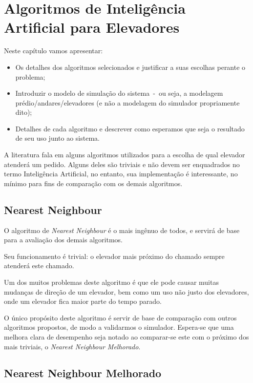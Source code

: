 \chapter{\label{chap:ai}Algoritmos de Inteligência Artificial para Elevadores}

Neste capítulo vamos apresentar:

\begin{itemize}
\item Os detalhes dos algoritmos selecionados e justificar a suas escolhas perante o problema;
\item Introduzir o modelo de simulação do sistema~-~ou seja, a modelagem
prédio/andares/elevadores (e não a modelagem do simulador propriamente dito);
\item Detalhes de cada algoritmo e descrever como esperamos que seja o resultado de seu uso junto ao sistema.
\end{itemize}

A literatura fala em alguns algoritmos utilizados para a escolha de qual
elevador atenderá um pedido. Alguns deles são triviais e não devem ser
enquadrados no termo Inteligência Artificial, no entanto, sua implementação é
interessante, no mínimo para fins de comparação com os demais algoritmos.

\section{\label{sec:ai:nn}Nearest Neighbour}

O algoritmo de \textit{Nearest Neighbour} é o mais ingênuo de todos, e servirá
de base para a avaliação dos demais algoritmos.

Seu funcionamento é trivial: o elevador mais próximo do chamado sempre
atenderá este chamado.

Um dos muitos problemas deste algoritmo é que ele pode causar muitas mudanças de
direção de um elevador, bem como um uso não justo dos elevadores, onde um
elevador fica maior parte do tempo parado.

O único propósito deste algoritmo é servir de base de comparação com outros
algoritmos propostos, de modo a validarmos o simulador. Espera-se que uma
melhora clara de desempenho seja notado ao comparar-se este com o próximo dos
mais triviais, o \textit{Nearest Neighbour Melhorado}.


\section{\label{sec:ai:nnm}Nearest Neighbour Melhorado}

